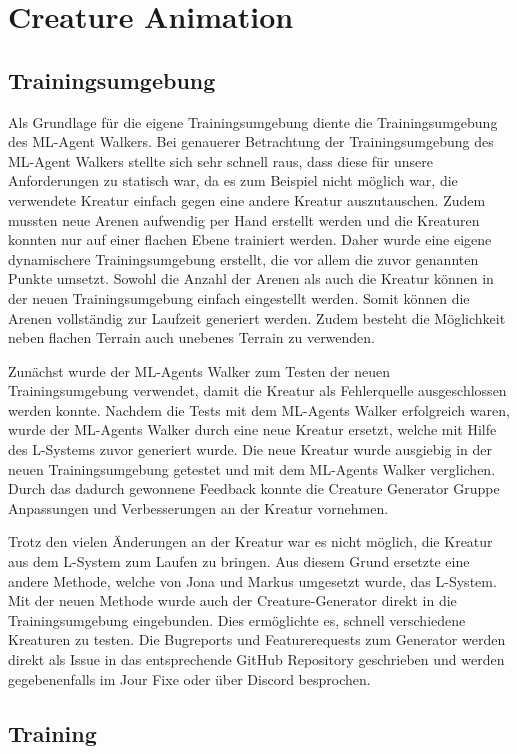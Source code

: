 \section{Creature Animation}

\subsection{Trainingsumgebung}
Als Grundlage für die eigene Trainingsumgebung diente die Trainingsumgebung des ML-Agent Walkers. Bei genauerer Betrachtung der Trainingsumgebung des ML-Agent Walkers stellte sich sehr schnell raus, dass diese für unsere Anforderungen zu statisch war, da es zum Beispiel nicht möglich war, die verwendete Kreatur einfach gegen eine andere Kreatur auszutauschen. Zudem mussten neue Arenen aufwendig per Hand erstellt werden und die Kreaturen konnten nur auf einer flachen Ebene trainiert werden. Daher wurde eine eigene dynamischere Trainingsumgebung erstellt, die vor allem die zuvor genannten Punkte umsetzt. Sowohl die Anzahl der Arenen als auch die Kreatur können in der neuen Trainingsumgebung einfach eingestellt werden. Somit können die Arenen vollständig zur Laufzeit generiert werden. Zudem besteht die Möglichkeit neben flachen Terrain auch unebenes Terrain zu verwenden.

Zunächst wurde der ML-Agents Walker zum Testen der neuen Trainingsumgebung verwendet, damit die Kreatur als Fehlerquelle ausgeschlossen werden konnte. Nachdem die Tests mit dem ML-Agents Walker erfolgreich waren, wurde der ML-Agents Walker durch eine neue Kreatur ersetzt, welche mit Hilfe des L-Systems zuvor generiert wurde. Die neue Kreatur wurde ausgiebig in der neuen Trainingsumgebung getestet und mit dem ML-Agents Walker verglichen. Durch das dadurch gewonnene Feedback konnte die Creature Generator Gruppe Anpassungen und Verbesserungen an der Kreatur vornehmen.

Trotz den vielen Änderungen an der Kreatur war es nicht möglich, die Kreatur aus dem L-System zum Laufen zu bringen. Aus diesem Grund ersetzte eine andere Methode, welche von Jona und Markus umgesetzt wurde, das L-System. Mit der neuen Methode wurde auch der Creature-Generator direkt in die Trainingsumgebung eingebunden. Dies ermöglichte es, schnell verschiedene Kreaturen zu testen. Die Bugreports und Featurerequests zum Generator werden direkt als Issue in das entsprechende GitHub Repository geschrieben und werden gegebenenfalls im Jour Fixe oder über Discord besprochen.


\subsection{Training}


